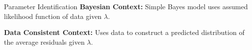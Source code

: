 \begin{block}{Parameter Identification}
\centering
            {\large \textbf{Bayesian Context:} Simple Bayes model uses assumed likelihood function of data given $\lambda$.}
            
            {\large \textbf{Data Consistent Context:} Uses data to construct a predicted distribution of the average residuals given $\lambda$.}
            



\end{block}

